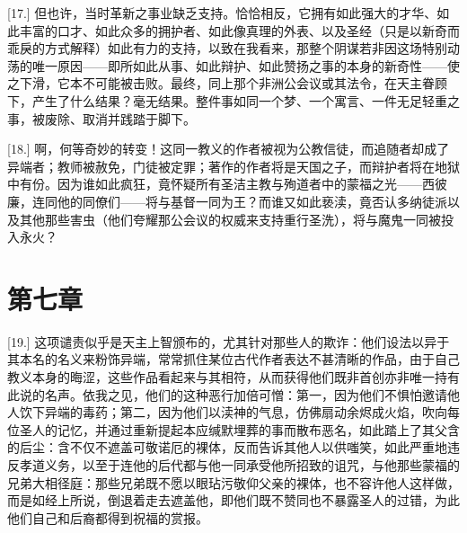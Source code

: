 [17.] 但也许，当时革新之事业缺乏支持。恰恰相反，它拥有如此强大的才华、如此丰富的口才、如此众多的拥护者、如此像真理的外表、以及圣经（只是以新奇而乖戾的方式解释）如此有力的支持，以致在我看来，那整个阴谋若非因这场特别动荡的唯一原因——即所如此从事、如此辩护、如此赞扬之事的本身的新奇性——使之下滑，它本不可能被击败。最终，同上那个非洲公会议或其法令，在天主眷顾下，产生了什么结果？毫无结果。整件事如同一个梦、一个寓言、一件无足轻重之事，被废除、取消并践踏于脚下。\par

[18.] 啊，何等奇妙的转变！这同一教义的作者被视为公教信徒，而追随者却成了异端者；教师被赦免，门徒被定罪；著作的作者将是天国之子，而辩护者将在地狱中有份。因为谁如此疯狂，竟怀疑所有圣洁主教与殉道者中的蒙福之光——西彼廉，连同他的同僚们——将与基督一同为王？而谁又如此亵渎，竟否认多纳徒派以及其他那些害虫（他们夸耀那公会议的权威来支持重行圣洗），将与魔鬼一同被投入永火？\par


\section{第七章}

\par

[19.] 这项谴责似乎是天主上智颁布的，尤其针对那些人的欺诈：他们设法以异于其本名的名义来粉饰异端，常常抓住某位古代作者表达不甚清晰的作品，由于自己教义本身的晦涩，这些作品看起来与其相符，从而获得他们既非首创亦非唯一持有此说的名声。依我之见，他们的这种恶行加倍可憎：第一，因为他们不惧怕邀请他人饮下异端的毒药；第二，因为他们以渎神的气息，仿佛扇动余烬成火焰，吹向每位圣人的记忆，并通过重新提起本应缄默埋葬的事而散布恶名，如此踏上了其父含的后尘：含不仅不遮盖可敬诺厄的裸体，反而告诉其他人以供嗤笑，如此严重地违反孝道义务，以至于连他的后代都与他一同承受他所招致的诅咒，与他那些蒙福的兄弟大相径庭：那些兄弟既不愿以眼玷污敬仰父亲的裸体，也不容许他人这样做，而是如经上所说，倒退着走去遮盖他，即他们既不赞同也不暴露圣人的过错，为此他们自己和后裔都得到祝福的赏报。\par


